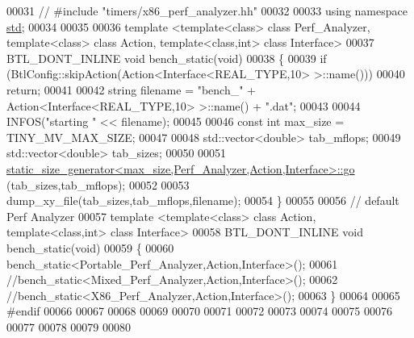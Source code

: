 \begin{DoxyCode}
00031 \textcolor{comment}{// #include "timers/x86\_perf\_analyzer.hh"}
00032 
00033 \textcolor{keyword}{using namespace }\hyperlink{namespacestd}{std};
00034 
00035 
00036 \textcolor{keyword}{template} <\textcolor{keyword}{template}<\textcolor{keyword}{class}> \textcolor{keyword}{class }Perf\_Analyzer, \textcolor{keyword}{template}<\textcolor{keyword}{class}> \textcolor{keyword}{class }Action, \textcolor{keyword}{template}<\textcolor{keyword}{class},\textcolor{keywordtype}{int}> \textcolor{keyword}{class }
      Interface>
00037 BTL\_DONT\_INLINE  \textcolor{keywordtype}{void} bench\_static(\textcolor{keywordtype}{void})
00038 \{
00039   \textcolor{keywordflow}{if} (BtlConfig::skipAction(Action<Interface<REAL\_TYPE,10> >::name()))
00040     \textcolor{keywordflow}{return};
00041 
00042   \textcolor{keywordtype}{string} filename = \textcolor{stringliteral}{"bench\_"} + Action<Interface<REAL\_TYPE,10> >::name() + \textcolor{stringliteral}{".dat"};
00043 
00044   INFOS(\textcolor{stringliteral}{"starting "} << filename);
00045 
00046   \textcolor{keyword}{const} \textcolor{keywordtype}{int} max\_size = TINY\_MV\_MAX\_SIZE;
00047 
00048   std::vector<double> tab\_mflops;
00049   std::vector<double> tab\_sizes;
00050 
00051   \hyperlink{structstatic__size__generator}{static\_size\_generator<max\_size,Perf\_Analyzer,Action,Interface>::go}
      (tab\_sizes,tab\_mflops);
00052 
00053   dump\_xy\_file(tab\_sizes,tab\_mflops,filename);
00054 \}
00055 
00056 \textcolor{comment}{// default Perf Analyzer}
00057 \textcolor{keyword}{template} <\textcolor{keyword}{template}<\textcolor{keyword}{class}> \textcolor{keyword}{class }Action, \textcolor{keyword}{template}<\textcolor{keyword}{class},\textcolor{keywordtype}{int}> \textcolor{keyword}{class }Interface>
00058 BTL\_DONT\_INLINE  \textcolor{keywordtype}{void} bench\_static(\textcolor{keywordtype}{void})
00059 \{
00060   bench\_static<Portable\_Perf\_Analyzer,Action,Interface>();
00061   \textcolor{comment}{//bench\_static<Mixed\_Perf\_Analyzer,Action,Interface>();}
00062   \textcolor{comment}{//bench\_static<X86\_Perf\_Analyzer,Action,Interface>();}
00063 \}
00064 
00065 \textcolor{preprocessor}{#endif}
00066 
00067 
00068 
00069 
00070 
00071 
00072 
00073 
00074 
00075 
00076 
00077 
00078 
00079 
00080 
\end{DoxyCode}
